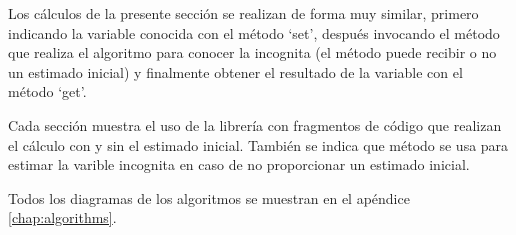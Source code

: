 	Los cálculos de la presente sección se realizan de forma muy similar, primero indicando la variable conocida con el método `set', después invocando el método que realiza el algoritmo para conocer la incognita (el método puede recibir o no un estimado inicial) y finalmente obtener el resultado de la variable con el método `get'.

	Cada sección muestra el uso de la librería con fragmentos de código que realizan el cálculo con y sin el estimado inicial. También se indica que método se usa para estimar la varible incognita en caso de no proporcionar un estimado inicial.

	Todos los diagramas de los algoritmos se muestran en el apéndice \ref{chap:algorithms}.
		

		